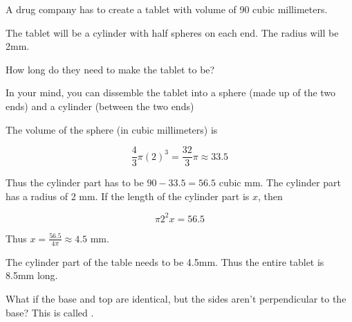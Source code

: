 \begin{Exercise}[title={Tablet}, label=tablet]

  A drug company has to create a tablet with volume of 90 cubic millimeters.

  The tablet will be a cylinder with half spheres on each end.  The radius will be 2mm.

  How long do they need to make the tablet to be?

  \vspace{2mm}
  
  

\end{Exercise}
\begin{Answer}[ref=tablet]
  In your mind, you can dissemble the tablet into a sphere (made up of
  the two ends) and a cylinder (between the two ends)
  
  The volume of the sphere (in cubic millimeters) is

  $$\frac{4}{3}\pi (2)^3 =\frac{32}{3}\pi \approx 33.5$$

  Thus the cylinder part has to be $90 - 33.5 = 56.5$ cubic mm. The
  cylinder part has a radius of 2 mm. If the length of the cylinder
  part is $x$, then

  $$\pi 2^2 x = 56.5$$

  Thus $x = \frac{56.5}{4 \pi} \approx 4.5$ mm.

  The cylinder part of the table needs to be 4.5mm.  Thus the entire tablet is 8.5mm long.
  
\end{Answer}

What if the base and top are identical, but the sides aren't
perpendicular to the base? This is called .

